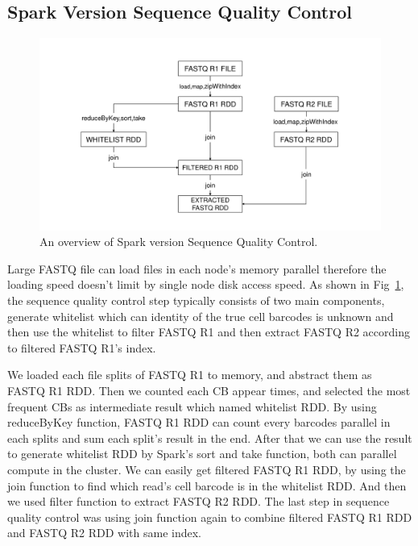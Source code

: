 \documentclass[runningheads]{llncs}
\begin{document}
\subsection{Spark Version Sequence Quality Control}
\begin{figure}
  \includegraphics[width=\textwidth]{fig1.pdf}
  \caption{An overview of Spark version Sequence Quality Control.} \label{fig1}
\end{figure}  
Large FASTQ file can load files in each node's memory parallel therefore the loading speed doesn't limit by single node disk access speed.
As shown in Fig~\ref{fig1}, the sequence quality control step typically consists of two main components, generate whitelist which can identity of the true cell barcodes is unknown and then use the whitelist to filter FASTQ R1 and then extract FASTQ R2 according to filtered FASTQ R1's index.

We loaded each file splits of FASTQ R1 to memory, and abstract them as FASTQ R1 RDD.
Then we counted each CB appear times, and selected the most frequent CBs as intermediate result which named whitelist RDD.
By using reduceByKey function, FASTQ R1 RDD can count every barcodes parallel in each splits and sum each split's result in the end.
After that we can use the result to generate whitelist RDD by Spark's sort and take function, both can parallel compute in the cluster.
We can easily get filtered FASTQ R1 RDD, by using the join function to find which read's cell barcode is in the whitelist RDD.
And then we used filter function to extract FASTQ R2 RDD.
The last step in sequence quality control was using join function again to combine filtered FASTQ R1 RDD and FASTQ R2 RDD with same index.
\end{document}
